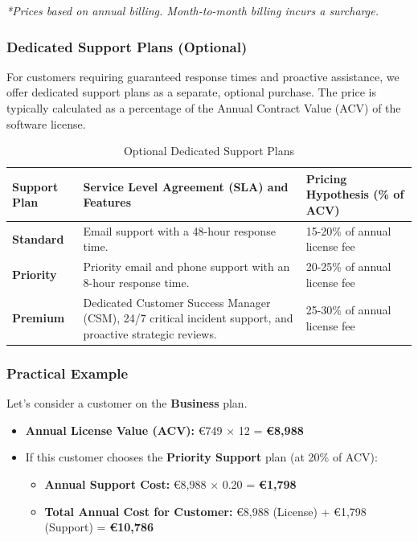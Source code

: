 \documentclass[11pt, a4paper, oneside]{article}
\begin{document}
\noindent \textit{*Prices based on annual billing. Month-to-month billing incurs a surcharge.}

\subsubsection{Dedicated Support Plans (Optional)}
For customers requiring guaranteed response times and proactive assistance, we offer dedicated support plans as a separate, optional purchase. The price is typically calculated as a percentage of the Annual Contract Value (ACV) of the software license.

\begin{table}[H]
    \centering
    \caption{Optional Dedicated Support Plans}
    \label{tab:support_plans}
    \begin{tabularx}{\textwidth}{L L l}
    \toprule
    \textbf{Support Plan} & \textbf{Service Level Agreement (SLA) and Features} & \textbf{Pricing Hypothesis (\% of ACV)} \\
    \midrule
    \textbf{Standard} & Email support with a 48-hour response time. & 15-20\% of annual license fee \\
    \textbf{Priority} & Priority email and phone support with an 8-hour response time. & 20-25\% of annual license fee \\
    \textbf{Premium} & Dedicated Customer Success Manager (CSM), 24/7 critical incident support, and proactive strategic reviews. & 25-30\% of annual license fee \\
    \bottomrule
    \end{tabularx}
\end{table}

\subsubsection{Practical Example}
Let's consider a customer on the \textbf{Business} plan.
\begin{itemize}
    \item \textbf{Annual License Value (ACV):} \euro{749} $\times$ 12 = \textbf{\euro{8,988}}
    \item If this customer chooses the \textbf{Priority Support} plan (at 20\% of ACV):
    \begin{itemize}
        \item \textbf{Annual Support Cost:} \euro{8,988} $\times$ 0.20 = \textbf{\euro{1,798}}
        \item \textbf{Total Annual Cost for Customer:} \euro{8,988} (License) + \euro{1,798} (Support) = \textbf{\euro{10,786}}
    \end{itemize}
\end{itemize}
\end{document}
